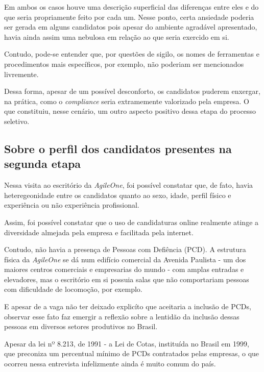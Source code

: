 \documentclass[12pt]{article}
\begin{document}
Em ambos os casos houve uma descrição superficial das diferenças entre eles e do que seria propriamente feito por cada um. Nesse ponto, certa ansiedade poderia ser gerada em alguns candidatos pois apesar do ambiente agradável apresentado, havia ainda assim uma nebulosa em relação ao que seria exercido em si. 

Contudo, pode-se entender que, por questões de sigilo, os nomes de ferramentas e procedimentos mais específicos, por exemplo, não poderiam ser mencionados livremente. 

Dessa forma, apesar de um possível desconforto, os candidatos puderem enxergar, na prática, como o \emph{compliance} seria extramemente valorizado pela empresa. O que constituiu, nesse cenário, um outro aspecto positivo dessa etapa do processo seletivo.


\subsection {Sobre o perfil dos candidatos presentes na segunda etapa}

Nessa visita ao escritório da \textit{AgileOne}, foi possível constatar que, de fato, havia heteregeonidade entre os candidatos quanto ao sexo, idade, perfil físico e experiência ou não experiência profissional. 

Assim, foi possível constatar que o uso de candidaturas online realmente atinge a diversidade almejada pela empresa e facilitada pela internet. 

Contudo, não havia a presença de Pessoas com Defiência (PCD). A estrutura física da \emph {AgileOne} se dá num edifício comercial da Avenida Paulista - um dos maiores centros comerciais e empresarias do mundo  - com amplas entradas e elevadores, mas o escritório em si possuia salas que não comportariam pessoas com dificuldade de locomoção, por exemplo. 

E apesar de a vaga não ter deixado explicíto que aceitaria a inclusão de PCDs, observar esse fato faz emergir a reflexão sobre a lentidão da  inclusão dessas pessoas em diversos setores produtivos no  Brasil.

Apesar da  lei nº 8.213, de 1991 -  a Lei de Cotas, instituída no Brasil em 1999, que preconiza  um percentual mínimo de PCDs contratados pelas empresas,  o que ocorreu nessa entrevista infelizmente ainda é muito comum do país.
\end{document}

